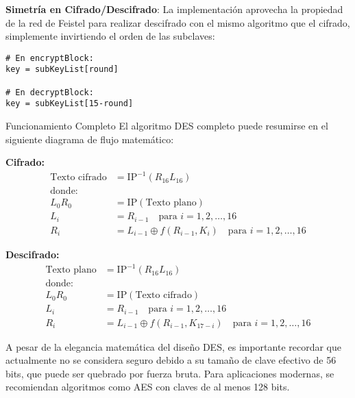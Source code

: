 \begin{securitygoodpractice}
	\textbf{Simetría en Cifrado/Descifrado}: La implementación aprovecha la propiedad de la red de Feistel para realizar descifrado con el mismo algoritmo que el cifrado, simplemente invirtiendo el orden de las subclaves:

	\begin{lstlisting}[style=cryptoalgo]
# En encryptBlock:
key = subKeyList[round]

# En decryptBlock:
key = subKeyList[15-round]
\end{lstlisting}
\end{securitygoodpractice}

\begin{cryptoanalysis}{Funcionamiento Completo}
	El algoritmo DES completo puede resumirse en el siguiente diagrama de flujo matemático:

	\textbf{Cifrado:}
	\begin{align}
		\text{Texto cifrado} & = \text{IP}^{-1}(R_{16}L_{16})                                           \\
		\text{donde:}                                                                                   \\
		L_0R_0               & = \text{IP}(\text{Texto plano})                                          \\
		L_i                  & = R_{i-1} \quad \text{para } i = 1, 2, \ldots, 16                        \\
		R_i                  & = L_{i-1} \oplus f(R_{i-1}, K_i) \quad \text{para } i = 1, 2, \ldots, 16
	\end{align}

	\textbf{Descifrado:}
	\begin{align}
		\text{Texto plano} & = \text{IP}^{-1}(R_{16}L_{16})                                                \\
		\text{donde:}                                                                                      \\
		L_0R_0             & = \text{IP}(\text{Texto cifrado})                                             \\
		L_i                & = R_{i-1} \quad \text{para } i = 1, 2, \ldots, 16                             \\
		R_i                & = L_{i-1} \oplus f(R_{i-1}, K_{17-i}) \quad \text{para } i = 1, 2, \ldots, 16
	\end{align}
\end{cryptoanalysis}

\begin{securityalert}
	A pesar de la elegancia matemática del diseño DES, es importante recordar que actualmente no se considera seguro debido a su tamaño de clave efectivo de 56 bits, que puede ser quebrado por fuerza bruta. Para aplicaciones modernas, se recomiendan algoritmos como AES con claves de al menos 128 bits.
\end{securityalert}